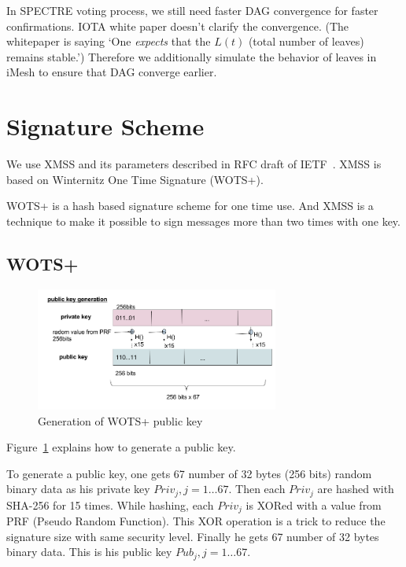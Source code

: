 \documentclass[a4paper,10pt,twocolumn]{article}
\begin{document}
In SPECTRE voting process, we still need faster DAG convergence for faster confirmations.
IOTA white paper doesn't clarify the convergence.
(The whitepaper is saying `One \emph{expects} that the \( L(t) \) (total number of leaves) remains stable.')
Therefore we additionally simulate the behavior of leaves in iMesh to ensure that DAG converge earlier.

\section{Signature Scheme}
\label{sec:sig}

We use XMSS and its parameters described in RFC draft of IETF~\cite{ietf}.
XMSS is based on Winternitz One Time Signature (WOTS+). 

WOTS+ is a hash based signature scheme for one time use.
And XMSS is a technique to make it possible to sign messages more than two times with one key.

\subsection{WOTS+}

\begin{figure}[ht]
	\begin{center}
	\includegraphics[width=80mm]{wots_pub.png}
	  \caption{Generation of WOTS+ public key}
    \label{fig:wots_pub}
	\end{center}
 \end{figure}

 Figure~\ref{fig:wots_pub} explains how to generate a public key.

 To generate a public key, one gets 67 number of 32 bytes (256 bits) random binary data as his private key \( Priv_{j}, j=1 \ldots 67\).
 Then each \( Priv_{j} \) are hashed with SHA-256 for 15 times. While hashing, each  \( Priv_{j} \) is XORed with a value from PRF (Pseudo Random Function).
 This XOR operation is a trick to reduce the signature size with same security level.
 Finally he gets 67 number of 32 bytes binary data. This is his public key \( Pub_{j}, j=1 \ldots 67\).
\end{document}
